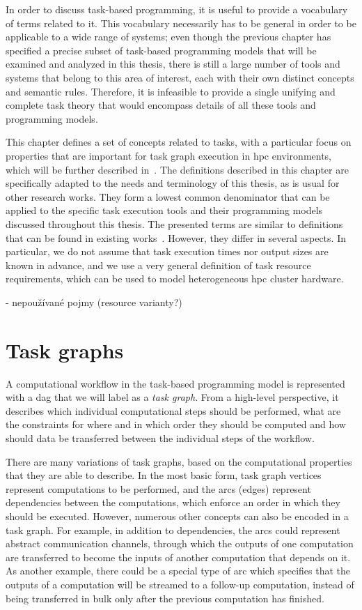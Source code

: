 In order to discuss task-based programming, it is useful to provide a vocabulary of terms related
to it. This vocabulary necessarily has to be general in order to be applicable to a wide range of
systems; even though the previous chapter has specified a precise subset of task-based programming
models that will be examined and analyzed in this thesis, there is still a large number of tools
and systems that belong to this area of interest, each with their own distinct concepts and
semantic rules. Therefore, it is infeasible to provide a single unifying and complete task theory
that would encompass details of all these tools and programming models.

This chapter defines a set of concepts related to tasks, with a particular focus on properties that
are important for task graph execution in \gls{hpc} environments, which will be
further described in~. The definitions described in this chapter are
specifically adapted to the needs and terminology of this thesis, as is usual for other research
works. They form a lowest common denominator that can be applied to the specific task execution
tools and their programming models discussed throughout this thesis. The presented terms are
similar to definitions that can be found in existing works~\cite{task_scheduling,hagras2003static,wang2018list}. However, they
differ in several aspects. In particular, we do not assume that task execution times nor output
sizes are known in advance, and we use a very general definition of task resource requirements,
which can be used to model heterogeneous \gls{hpc} cluster hardware.

- nepoužívané pojmy (resource varianty?)

\section{Task graphs}
A computational workflow in the task-based programming model is represented with a
\gls{dag} that we will label as a \emph{task graph}. From a high-level
perspective, it describes which individual computational steps should be performed, what are the
constraints for where and in which order they should be computed and how should data be transferred
between the individual steps of the workflow.

There are many variations of task graphs, based on the computational properties that they are able
to describe. In the most basic form, task graph vertices represent computations to be performed,
and the arcs (edges) represent dependencies between the computations, which enforce an order in
which they should be executed. However, numerous other concepts can also be encoded in a task
graph. For example, in addition to dependencies, the arcs could represent abstract communication
channels, through which the outputs of one computation are transferred to become the inputs of
another computation that depends on it. As another example, there could be a special type of arc
which specifies that the outputs of a computation will be streamed to a follow-up computation,
instead of being transferred in bulk only after the previous computation has finished.

